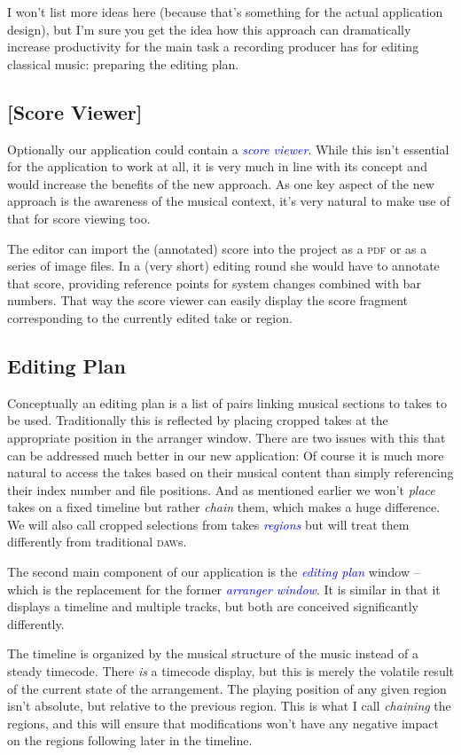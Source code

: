 \documentclass[11pt,a4paper]{article}
\newcommand*{\term}[1]{\textcolor{blue}{\emph{#1}}}
\begin{document}
I won't list more ideas here (because that's something for the actual
application design), but I'm sure you get the idea how this approach can
dramatically increase productivity for the main task a recording producer has
for editing classical music: preparing the editing plan.

\subsection{[Score Viewer]}
Optionally our application could contain a \term{score viewer}.
While this isn't essential for the application to work at all, it is very much in
line with its concept and would increase the benefits of the new approach.
As one key aspect of the new approach is the awareness of the musical context,
it's very natural to make use of that for score viewing too.

The editor can import the (annotated) score into the project as a \textsc{pdf} or as a
series of image files.
In a (very short) editing round she would have to annotate that score, providing
reference points for system changes combined with bar numbers.
That way the score viewer can easily display the score fragment corresponding to
the currently edited take or region.

\subsection{Editing Plan}
Conceptually an editing plan is a list of pairs linking musical sections to
takes to be used.
Traditionally this is reflected by placing cropped takes at the appropriate
position in the arranger window.
There are two issues with this that can be addressed much better in our new
application:
Of course it is much more natural to access the takes based on their musical
content than simply referencing their index number and file positions.
And as mentioned earlier we won't \emph{place} takes on a fixed timeline but
rather \emph{chain} them, which makes a huge difference.
We will also call cropped selections from takes \term{regions} but will treat them
differently from traditional \textsc{daw}s.

\medskip
The second main component of our application is the \term{editing plan} window
-- which is the replacement for the former \term{arranger window}.
It is similar in that it displays a timeline and multiple tracks, but both are
conceived significantly differently.

The timeline is organized by the musical structure of the music instead of a
steady timecode.
There \emph{is} a timecode display, but this is merely the volatile result of
the current state of the arrangement.
The playing position of any given region isn't absolute, but relative to the
previous region.
This is what I call \emph{chaining} the regions, and this will ensure that
modifications won't have any negative impact on the regions following later in
the timeline.
\end{document}
